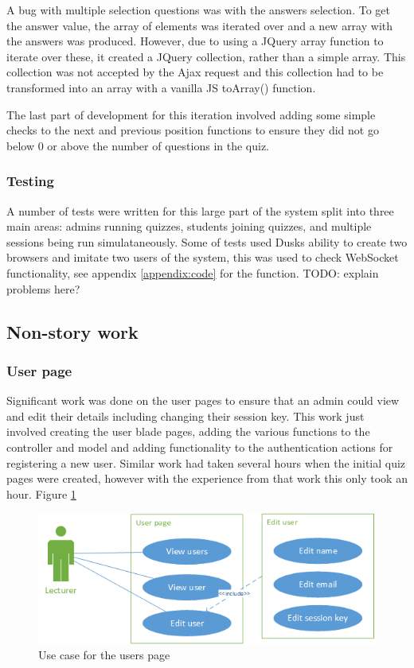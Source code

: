 A bug with multiple selection questions was with the answers selection. To get the answer value, the array of elements was iterated over and a new array with the answers was produced. However, due to using a JQuery array function to iterate over these, it created a JQuery collection, rather than a simple array. This collection was not accepted by the Ajax request and this collection had to be transformed into an array with a vanilla JS toArray() function.

The last part of development for this iteration involved adding some simple checks to the next and previous position functions to ensure they did not go below 0 or above the number of questions in the quiz.

\subsubsection{Testing}
A number of tests were written for this large part of the system split into three main areas: admins running quizzes, students joining quizzes, and multiple sessions being run simulataneously. Some of tests used Dusks ability to create two browsers and imitate two users of the system, this was used to check WebSocket functionality, see appendix \ref{appendix:code} for the function. TODO: explain problems here?
\newpage

\subsection{Non-story work}
\subsubsection{User page}
Significant work was done on the user pages to ensure that an admin could view and edit their details including changing their session key. This work just involved creating the user blade pages, adding the various functions to the controller and model and adding functionality to the authentication actions for registering a new user. Similar work had taken several hours when the initial quiz pages were created, however with the experience from that work this only took an hour. Figure \ref{fig:iter-5-users-use-case}

\begin{figure}
	\caption{Use case for the users page}
	\centerline{\includegraphics{Chapter2/Iter-5/iter-5-users-use-case}}
	\label{fig:iter-5-users-use-case}
\end{figure}


